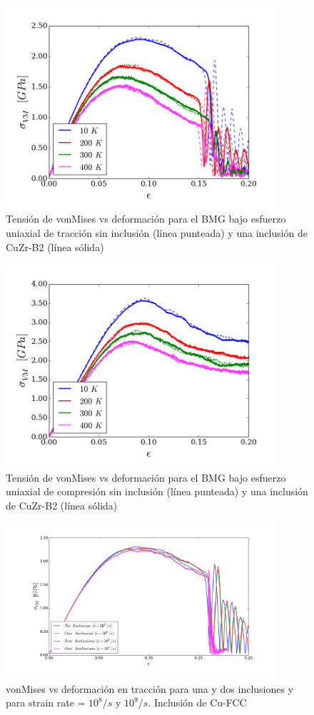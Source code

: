 \documentclass[10pt, oneside]{article} %
\begin{document}
\begin{figure}[H]
\centering
\includegraphics[width=10cm]{../Figures/Cap_4/stress_strain_tension_B2_NoInc.png}
\caption[vonMises vs deformación en tracción. Inclusión de CuZr-B2]{Tensión de vonMises vs deformación para el BMG bajo esfuerzo uniaxial de tracción sin inclusión (línea punteada) y una inclusión de CuZr-B2 (línea sólida)}
\label{C4:fg:fcc_vm_tension}
\end{figure}

\begin{figure}[H]
\centering
\includegraphics[width=10cm]{../Figures/Cap_4/stress_strain_compression_B2_NoInc.png}
\caption[vonMises vs deformación en compresión. Inclusión de CuZr-B2]{Tensión de vonMises vs deformación para el BMG bajo esfuerzo uniaxial de compresión sin inclusión (línea punteada) y una inclusión de CuZr-B2 (línea sólida)}
\label{C4:fg:fcc_vm_compression}
\end{figure}

\begin{figure}[H]
\centering
\includegraphics[width=10cm]{Figures/NanoParticles/compALL.png}
\caption{vonMises vs deformación en tracción para una y dos inclusiones y para strain rate = $10^{8}/s$ y $10^{9}/s$. Inclusión de Cu-FCC}
\end{figure}
\end{document}
